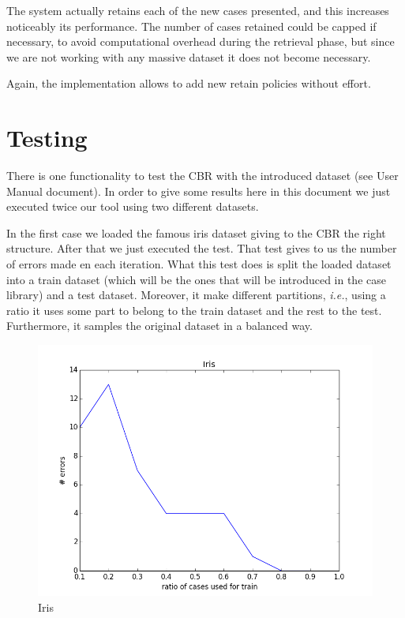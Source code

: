 \documentclass[11pt]{article}
\begin{document}
The system actually retains each of the new cases presented, and this increases noticeably its performance. The number of cases retained could be capped if necessary, to avoid computational overhead during the retrieval phase, but since we are not working with any massive dataset it does not become necessary.

Again, the implementation allows to add new retain policies without effort.

\section{Testing}

There is one functionality to test the CBR with the introduced dataset (see User Manual document). In order to give some results here in  this document we just executed twice our tool using two different datasets.

In the first case we loaded the famous iris dataset giving to the CBR the right structure. After that we just executed the test. That test gives to us the number of errors made en each iteration. What this test does is split the loaded dataset into a train dataset (which will be the ones that will be introduced in the case library) and a test dataset. Moreover, it make different partitions, \emph{i.e.}, using a ratio it uses some part to belong to the train dataset and the rest to the test. Furthermore, it samples the original dataset in a balanced way.

\begin{figure}[htb]
    \center
    \includegraphics[width=0.7\linewidth]{images/iris}
    \caption{Iris}
    \label{fig:iris}
\end{figure}
\end{document}
